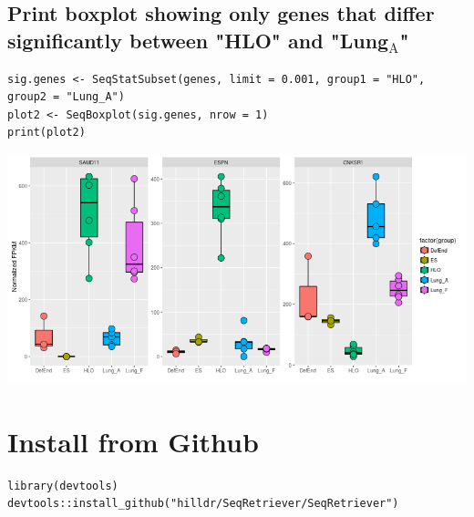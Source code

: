 \documentclass[11pt]{article}
\begin{document}
\subsection{Print boxplot showing only genes that differ significantly between "HLO" and "Lung$_{\text{A}}$"}
\label{sec-4-5}
\begin{verbatim}
sig.genes <- SeqStatSubset(genes, limit = 0.001, group1 = "HLO", group2 = "Lung_A")
plot2 <- SeqBoxplot(sig.genes, nrow = 1)
print(plot2)
\end{verbatim}

\includegraphics[width=.9\linewidth]{sig-boxplots.png}

\section{{\bfseries\sffamily } Install from Github}
\label{sec-5}
\begin{verbatim}
library(devtools)
devtools::install_github("hilldr/SeqRetriever/SeqRetriever")
\end{verbatim}
\end{document}
